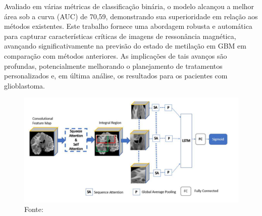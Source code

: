 Avaliado em várias métricas de classificação binária, o modelo alcançou a melhor área sob a curva (AUC) de 70,59, demonstrando sua superioridade em relação aos métodos existentes. Este trabalho fornece uma abordagem robusta e automática para capturar características críticas de imagens de ressonância magnética, avançando significativamente na previsão do estado de metilação em GBM em comparação com métodos anteriores. As implicações de tais avanços são profundas, potencialmente melhorando o planejamento de tratamentos personalizados e, em última análise, os resultados para os pacientes com glioblastoma.

\begin{figure}[htbp]
    \centering
    \includegraphics[width=1\textwidth]{figures/fig010.png}
    \caption{Fonte: \cite{iranmehrImprovedPredictionMGMT2022}}
    \label{fig:fig010}
\end{figure}

